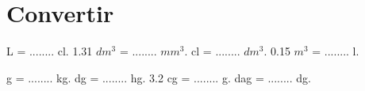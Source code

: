\section{Convertir}

\begin{questions}
\begin{Large}
		\begin{multicols}{2}
		 L = ........ cl.
		\question \num{1.31} $dm^3$ = ........ $mm^3$.
		 cl = ........ $dm^3$.
		\question \num{0.15} $m^3$ = ........ l.
		
		 g = ........ kg.
		 dg = ........ hg.
		\question \num{3.2} cg = ........ g.
		 dag = ........ dg.
	\end{multicols}
\end{Large}
\end{questions}